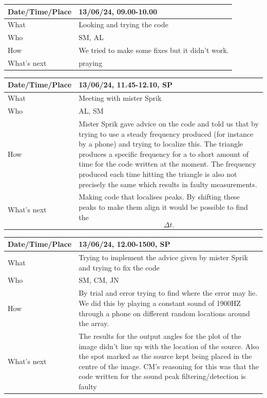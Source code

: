 \documentclass{article}
\begin{document}
\begin{table}[H]
\begin{tabular}{|p{1.5in}|p{4in}|}
\hline
Date/Time/Place &  13/06/24, 09.00-10.00\\ \hline
What            &  Looking and trying the code\\ \hline
Who             &  SM, AL\\ \hline
How             &  We tried to make some fixes but it didn't work.\\ \hline
What's next     &  praying\\ \hline
\end{tabular}
\end{table}

\begin{table}[H]
\begin{tabular}{|p{1.5in}|p{4in}|}
\hline
Date/Time/Place & 13/06/24, 11.45-12.10, SP \\ \hline
What            & Meeting with mister Sprik \\ \hline
Who             & AL, SM \\ \hline
How             & Mister Sprik gave advice on the code and told us that by trying to use a steady frequency produced (for instance by a phone) and trying to localize this. The triangle produces a specific frequency for a to short amount of time for the code written at the moment. The frequency produced each time hitting the triangle is also not precisely the same which results in faulty measurements.   \\ \hline
What's next     & Making code that localises peaks. By shifting these peaks to make them align it would be possible to find the $$\Delta t.$$ \\ \hline
\end{tabular}
\end{table}

\begin{table}[H]
\begin{tabular}{|p{1.5in}|p{4in}|}
\hline
Date/Time/Place & 13/06/24, 12.00-1500, SP \\ \hline
What            & Trying to implement the advice given by mister Sprik and trying to fix the code \\ \hline
Who             & SM, CM, JN \\ \hline
How             & By trial and error trying to find where the error may lie. We did this by playing a constant sound of 1900HZ through a phone on different random locations around the array. \\ \hline
What's next     &  The results for the output angles for the plot of the image didn't line up with the location of the source. Also the spot marked as the source kept being placed in the centre of the image. CM's reasoning for this was that the code written for the sound peak filtering/detection is faulty  \\ \hline
\end{tabular}
\end{table}
\end{document}
